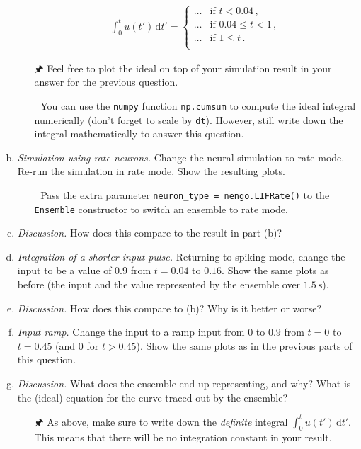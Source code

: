 \begin{enumerate}[a)]
\begin{itemize}
\begin{align*}
				\int_{0}^{t} u(t') \,\mathrm{d}{t'} = \begin{cases}
					\ldots & \text{if } t < 0.04 \,,\\
					\ldots & \text{if } 0.04 \leq t < 1 \,,\\
					\ldots & \text{if } 1 \leq t \,.\\
				\end{cases}
			\end{align*}
			\item[{\symbolfont 🖈}] Feel free to plot the ideal on top of your simulation result in your answer for the previous question.
			\item[{\symbolfont 🐍}] You can use the \texttt{numpy} function \texttt{np.cumsum} to compute the ideal integral numerically (don't forget to scale by \texttt{dt}). However, still write down the integral mathematically to answer this question.
		\end{itemize}
		\item {} \emph{Simulation using rate neurons.} Change the neural simulation to rate mode. Re-run the simulation in rate mode. Show the resulting plots.
		\begin{itemize}
			\item[{\symbolfont 🐍}] Pass the extra parameter \texttt{neuron\_type = nengo.LIFRate()} to the \texttt{Ensemble} constructor to switch an ensemble to rate mode.
		\end{itemize}
		\item {} \emph{Discussion.} How does this compare to the result in part (b)?
		\item {} \emph{Integration of a shorter input pulse.} Returning to spiking mode, change the input to be a value of $0.9$ from $t=0.04$ to $0.16$. Show the same plots as before (the input and the value represented by the ensemble over $\SI{1.5}{\second}$). 
		\item {} \emph{Discussion.} How does this compare to (b)? Why is it better or worse?
		\item {} \emph{Input ramp.} Change the input to a ramp input from $0$ to $0.9$ from $t=0$ to $t=0.45$ (and $0$ for $t>0.45$). Show the same plots as in the previous parts of this question.
		\item {} \emph{Discussion.} What does the ensemble end up representing, and why? What is the (ideal) equation for the curve traced out by the ensemble? 
		\begin{itemize}
			\item[{\symbolfont 🖈}] As above, make sure to write down the \emph{definite} integral $\int_0^t u(t') \,\mathrm{d}t'$. This means that there will be no integration constant in your result.

\end{itemize}
\end{enumerate}
